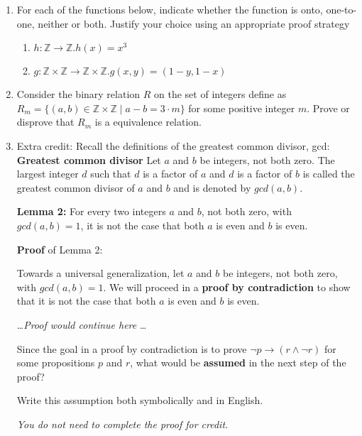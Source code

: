 \documentclass[12pt, oneside]{article}
\begin{document}
\begin{enumerate}
\item For each of the functions below, indicate whether the function is onto, one-to-one, neither or both. Justify your choice using an appropriate proof strategy

\begin{enumerate}
    \item $h: \mathbb{Z} \to \mathbb{Z}. h(x) = x^3$
    \item $g: \mathbb{Z} \times \mathbb{Z} \to \mathbb{Z} \times \mathbb{Z}. g(x, y) = (1-y, 1-x)$

\end{enumerate}

\item Consider the binary relation $R$ on the set of integers define as $R_m= \{(a,b) \in \mathbb{Z} \times \mathbb{Z} \mid a - b = 3\cdot m\}$ for some positive integer $m$.  Prove or disprove that $R_m$ is a equivalence relation. 






\item Extra credit: Recall the definitions of the greatest common divisor, gcd:
\label{gcd_proof}
{\bf Greatest common divisor} Let $a$ and $b$ be integers, not both zero. The largest integer $d$ such that 
$d$ is a  factor of $a$ and $d$ is a factor of  $b$ is called the greatest common divisor of $a$ and $b$ 
and is denoted by $gcd(a, b)$.


{\bf Lemma 2:} For every two integers $a$ and  $b$, not both zero, with  $gcd(a,b) = 1$, it is not the case that both $a$
is  even and $b$ is even.

{\bf Proof} of Lemma 2:

Towards a universal generalization, let $a$ and $b$ be integers, not both zero, with $gcd(a,b) = 1$. 
We will proceed in a {\bf proof by contradiction} to show that it is not the case that both $a$ is even and $b$ is even.

\ldots {\it Proof would continue here} \ldots


Since the goal in a proof by contradiction is to prove $\lnot p \to (r \land \lnot r)$ for some propositions $p$ and $r$, what would be {\bf assumed} in the 
next step of the proof?

Write this assumption both symbolically and in English. 

{\it You do not need to complete the proof for credit.}



\end{enumerate}
\end{document}
